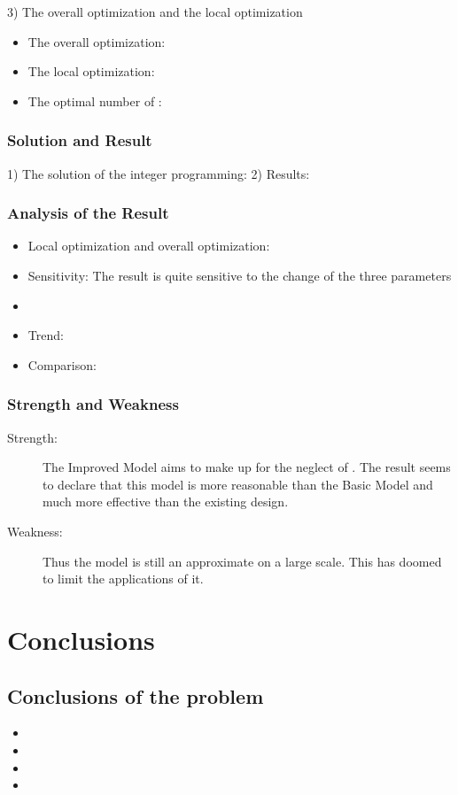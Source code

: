 \documentclass{apmcmthesis}
\begin{document}
3) The overall optimization and the local optimization

\begin{itemize}
  \item The overall optimization:
  \item The local optimization:
  \item The optimal number of        :
\end{itemize}



\subsubsection{Solution and Result}
1) The solution of the integer programming:
2) Results:
\subsubsection{Analysis of the Result}
\begin{itemize}
  \item Local optimization and overall optimization:
  \item Sensitivity: The result is quite sensitive to the change of the three parameters
  \item
  \item Trend:
  \item Comparison:
\end{itemize}
\subsubsection{Strength and Weakness}

\begin{description}
  \item[Strength:] The Improved Model aims to make up for the neglect of         . The result seems to declare that this model is more reasonable than the Basic Model and much more effective than the existing design.
  \item[Weakness:] Thus the model is still an approximate on a large scale. This has doomed to limit the applications of it.
\end{description}

\section{Conclusions}

\subsection{Conclusions of the problem}
\begin{itemize}
  \item
  \item
  \item
  \item
\end{itemize}
\end{document}
